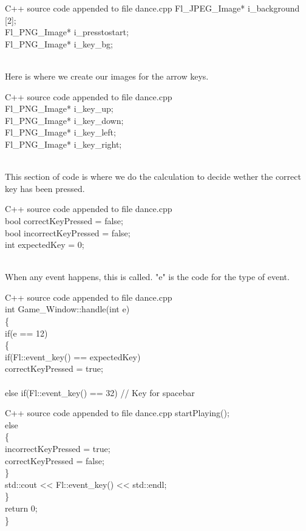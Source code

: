 \documentclass {article}
\begin{document}
\begin{GFT}{C++ source code appended to file dance.cpp}
\+Fl\_JPEG\_Image* i\_background [2];\\
\+Fl\_PNG\_Image* i\_presstostart;\\
\+Fl\_PNG\_Image* i\_key\_bg;\\
\+\\
\end{GFT}
Here is where we create our images for the arrow keys.
\begin{GFT}{C++ source code appended to file dance.cpp}
\+\\
\+Fl\_PNG\_Image* i\_key\_up;\\
\+Fl\_PNG\_Image* i\_key\_down;\\
\+Fl\_PNG\_Image* i\_key\_left;\\
\+Fl\_PNG\_Image* i\_key\_right;\\
\+\\
\end{GFT}
\clearpage
This section of code is where we do the calculation to decide wether the correct key has been pressed.
\begin{GFT}{C++ source code appended to file dance.cpp}
\+\\
\+bool correctKeyPressed = false;\\
\+bool incorrectKeyPressed = false;\\
\+int expectedKey = 0;\\
\+\\
\end{GFT}
When any event happens, this is called. "e" is the code for the type of event.
\begin{GFT}{C++ source code appended to file dance.cpp}
\+\\
\+int Game\_Window::handle(int e)\\
\+\{\\
\+	if(e == 12)\\
\+	\{\\
\+		if(Fl::event\_key() == expectedKey)\\
\+			correctKeyPressed = true;\\
\+\\
\+		else if(Fl::event\_key() == 32) // Key for spacebar\\
\end{GFT}
\clearpage
\begin{GFT}{C++ source code appended to file dance.cpp}
\+			startPlaying();\\
\+		else\\
\+		\{\\
\+			incorrectKeyPressed = true;\\
\+			correctKeyPressed = false;\\
\+		\}\\
\+		std::cout << Fl::event\_key() << std::endl;\\
\+	\}\\
\+      return 0;\\
\+\}\\
\+\\
\end{GFT}
\end{document}
